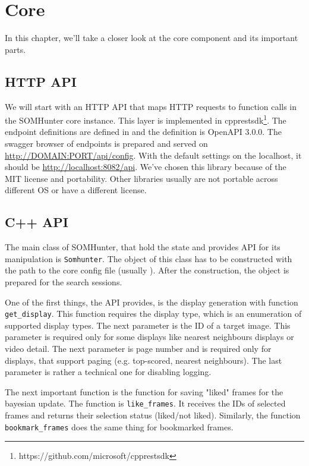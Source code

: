 \chapter{Core}
\label{comp-core}

In this chapter, we'll take a closer look at the core component and its important parts.

\section{HTTP API}

We will start with an HTTP API that maps HTTP requests to function calls in the SOMHunter core instance. This layer is implemented in cpprestsdk\footnote{https://github.com/microsoft/cpprestsdk}. The endpoint definitions are defined in  and the definition is OpenAPI 3.0.0. The swagger browser of endpoints is prepared and served on \url{http://DOMAIN:PORT/api/config}. With the default settings on the localhost, it should be \url{http://localhost:8082/api}. We've chosen this library because of the MIT license and portability. Other libraries usually are not portable across different OS or have a different license.

\section{C++ API}

The main class of SOMHunter, that hold the state and provides API for its manipulation is \lstinline{Somhunter}. The object of this class has to be constructed with the path to the core config file (usually ). After the construction, the object is prepared for the search sessions. 

One of the first things, the API provides, is the display generation with function \lstinline{get_display}. This function requires the display type, which is an enumeration of supported display types. The next parameter is the ID of a target image. This parameter is required only for some displays like nearest neighbours displays or video detail. The next parameter is page number and is required only for displays, that support paging (e.g. top-scored, nearest neighbours). The last parameter is rather a technical one for disabling logging. 

The next important function is the function for saving "liked" frames for the bayesian update. The function is \lstinline{like_frames}. It receives the IDs of selected frames and returns their selection status (liked/not liked). Similarly, the function \lstinline{bookmark_frames} does the same thing for bookmarked frames. 

